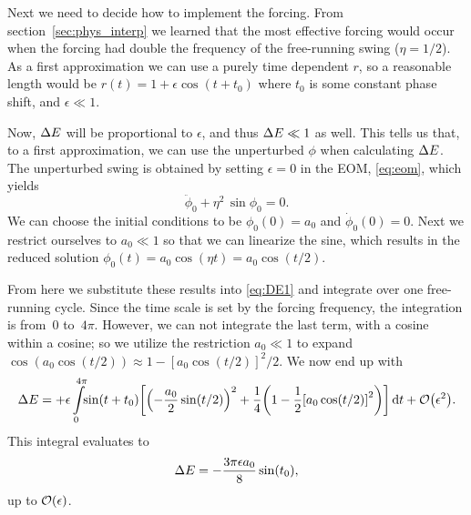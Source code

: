 Next we need to decide how to implement the forcing. From
section~\ref{sec:phys_interp} we learned that the most effective
forcing would occur when the forcing had double the frequency of the
free-running swing ($\eta=1/2$). As a first approximation we can use a purely time
dependent $r$, so a reasonable length would be
$ %
r(t)=1+\epsilon\cos(t+t_0)
$ %
where $t_0$ is some constant phase shift, and $\epsilon\ll1$. 

Now, $\Delta{E}$ will be proportional to $\epsilon$, and thus $\Delta{E}\ll1$ as
well. This tells us that, to a first approximation, we can use the
unperturbed $\phi$ when calculating $\Delta{E}$. The unperturbed swing is
obtained by setting $\epsilon=0$ in the EOM, \eqref{eq:eom}, which
yields
\begin{equation}
\ddot\phi_0+\eta^2\,\sin\phi_0=0.
\end{equation}
We can choose the initial conditions to be $\phi_0(0)=a_0$ and
$\dot\phi_0(0)=0$. Next we restrict ourselves to $a_0\ll1$ so that we
can linearize the sine, which results in the reduced solution
$\phi_0(t)=a_0\cos(\eta t)=a_0\cos(t/2)$.

From here we substitute these results into \eqref{eq:DE1} and
integrate over one free-running cycle. Since the time scale is set by
the forcing frequency, the integration is from~$0$ to~$4\pi$. However,
we can not integrate the last term, with a cosine within a cosine; so
we utilize the restriction $a_0\ll1$ to expand
$\cos(a_0\cos(t/2))\approx1-[a_0\cos(t/2)]^2/2$. 
We now end up with 
\begin{equation}
\DE=+\epsilon\int_0^{4\pi}\!\!\sin(t+t_0)
\qty[\qty(-\frac{a_0}{2}\sin(t/2))^2
+\frac{1}{4}\qty(1-\frac{1}{2}\qty[a_0\cos(t/2)]^2)
]\id{t}+\order{\epsilon^2}.
\end{equation}
This integral evaluates to
\begin{equation}\label{eq:DE_t0}
\DE%
=-\frac{3\pi\epsilon a_0}{8}\sin(t_0),
\end{equation}
up to $\order{\epsilon}$.


